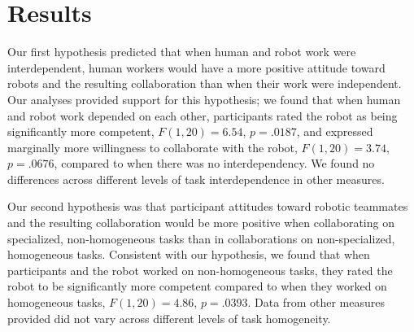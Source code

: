 \section{Results}
Our first hypothesis predicted that when human and robot work were interdependent, human workers would have a more positive attitude toward robots and the resulting collaboration than when their work were independent. Our analyses provided support for this hypothesis; we found that when human and robot work depended on each other, participants rated the robot as being significantly more competent, $F(1,20) = 6.54$, $p = .0187$, and expressed marginally more willingness to collaborate with the robot, $F(1, 20) = 3.74$, $p = .0676$, compared to when there was no interdependency. We found no differences across different levels of task interdependence in other measures.

Our second hypothesis was that participant attitudes toward robotic teammates and the resulting collaboration would be more positive when collaborating on specialized, non-homogeneous tasks than in collaborations on non-specialized, homogeneous tasks. Consistent with our hypothesis, we found that when participants and the robot worked on non-homogeneous tasks, they rated the robot to be significantly more competent compared to when they worked on homogeneous tasks, $F(1,20) = 4.86$, $p = .0393$. Data from other measures provided did not vary across different levels of task homogeneity.

